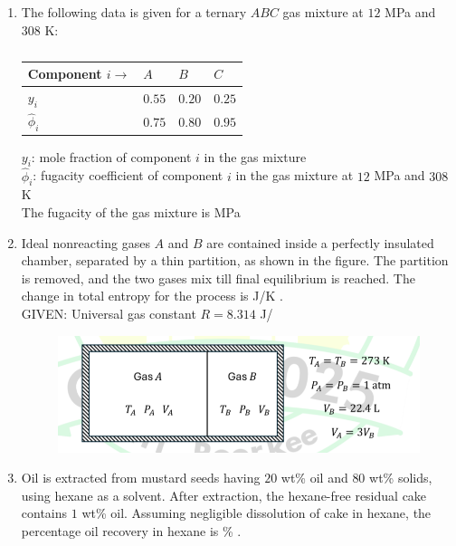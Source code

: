 \documentclass[journal,12pt,onecolumn]{IEEEtran}
\theoremstyle{remark}
\begin{document}
\begin{enumerate}
		\item The following data is given for a ternary $ABC$ gas mixture at $12$ MPa and $308$ K:
		\begin{table}[h]
			\centering
			\begin{tabular}{llll}
				Component $i \to$ & $A$ & $B$ & $C$ \\
				\hline
				$y_i$ & $0.55$ & $0.20$ & $0.25$ \\
				$\hat{\phi}_i$ & $0.75$ & $0.80$ & $0.95$ \\
			\end{tabular}
			\caption*{}
			\label{tab:q32}
		\end{table}
		$y_i$: mole fraction of component $i$ in the gas mixture \\
		$\hat{\phi}_i$: fugacity coefficient of component $i$ in the gas mixture at $12$ MPa and $308$ K \\
		The fugacity of the gas mixture is \underline{\hspace{2cm}} MPa 
		
		\hfill{}
		
		\item Ideal nonreacting gases $A$ and $B$ are contained inside a perfectly insulated chamber, separated by a thin partition, as shown in the figure. The partition is removed, and the two gases mix till final equilibrium is reached. The change in total entropy for the process is \underline{\hspace{2cm}} J/K . \\
		GIVEN: Universal gas constant $R = 8.314$ J/
		\begin{figure}[h]
			\centering
			\includegraphics[width=0.6\columnwidth]{q33.png}
			\caption*{}
			\label{fig:q33}
		\end{figure}
		
		\hfill{}
		
		\item Oil is extracted from mustard seeds having $20$ wt\% oil and $80$ wt\% solids, using hexane as a solvent. After extraction, the hexane-free residual cake contains $1$ wt\% oil. Assuming negligible dissolution of cake in hexane, the percentage oil recovery in hexane is \underline{\hspace{2cm}}\% .
		

\end{enumerate}
\end{document}
